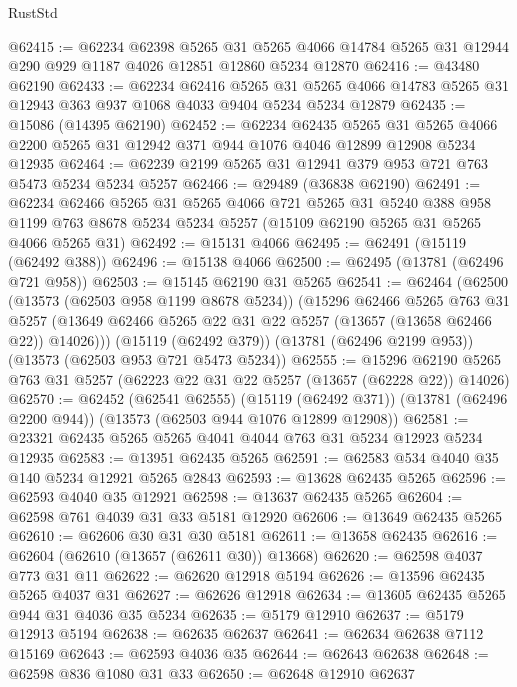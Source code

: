 \begin{lexlean}{RustStd}
\begin{coremodule}
@62415 := @62234
    @62398
    @5265
    @31
    @5265
    @4066
    @14784
    @5265
    @31
    @12944
    @290
    @929
    @1187
    @4026
    @12851
    @12860
    @5234
    @12870
@62416 := @43480 @62190
@62433 := @62234
    @62416
    @5265
    @31
    @5265
    @4066
    @14783
    @5265
    @31
    @12943
    @363
    @937
    @1068
    @4033
    @9404
    @5234
    @5234
    @12879
@62435 := @15086 (@14395 @62190)
@62452 := @62234
    @62435
    @5265
    @31
    @5265
    @4066
    @2200
    @5265
    @31
    @12942
    @371
    @944
    @1076
    @4046
    @12899
    @12908
    @5234
    @12935
@62464 := @62239 @2199 @5265 @31 @12941 @379 @953 @721 @763 @5473 @5234 @5234 @5257
@62466 := @29489 (@36838 @62190)
@62491 := @62234
    @62466
    @5265
    @31
    @5265
    @4066
    @721
    @5265
    @31
    @5240
    @388
    @958
    @1199
    @763
    @8678
    @5234
    @5234
    @5257
    (@15109 @62190 @5265 @31 @5265 @4066 @5265 @31)
@62492 := @15131 @4066
@62495 := @62491 (@15119 (@62492 @388))
@62496 := @15138 @4066
@62500 := @62495 (@13781 (@62496 @721 @958))
@62503 := @15145 @62190 @31 @5265
@62541 := @62464
    (@62500
      (@13573 (@62503 @958 @1199 @8678 @5234))
      (@15296
        @62466
        @5265
        @763
        @31
        @5257
        (@13649 @62466 @5265 @22 @31 @22 @5257 (@13657 (@13658 @62466 @22)) @14026)))
    (@15119 (@62492 @379))
    (@13781 (@62496 @2199 @953))
    (@13573 (@62503 @953 @721 @5473 @5234))
@62555 := @15296 @62190 @5265 @763 @31 @5257 (@62223 @22 @31 @22 @5257 (@13657 (@62228 @22)) @14026)
@62570 := @62452
    (@62541 @62555)
    (@15119 (@62492 @371))
    (@13781 (@62496 @2200 @944))
    (@13573 (@62503 @944 @1076 @12899 @12908))
@62581 := @23321 @62435 @5265 @5265 @4041 @4044 @763 @31 @5234 @12923 @5234 @12935
@62583 := @13951 @62435 @5265
@62591 := @62583 @534 @4040 @35 @140 @5234 @12921 @5265 @2843
@62593 := @13628 @62435 @5265
@62596 := @62593 @4040 @35 @12921
@62598 := @13637 @62435 @5265
@62604 := @62598 @761 @4039 @31 @33 @5181 @12920
@62606 := @13649 @62435 @5265
@62610 := @62606 @30 @31 @30 @5181
@62611 := @13658 @62435
@62616 := @62604 (@62610 (@13657 (@62611 @30)) @13668)
@62620 := @62598 @4037 @773 @31 @11
@62622 := @62620 @12918 @5194
@62626 := @13596 @62435 @5265 @4037 @31
@62627 := @62626 @12918
@62634 := @13605 @62435 @5265 @944 @31 @4036 @35 @5234
@62635 := @5179 @12910
@62637 := @5179 @12913 @5194
@62638 := @62635 @62637
@62641 := @62634 @62638 @7112 @15169
@62643 := @62593 @4036 @35
@62644 := @62643 @62638
@62648 := @62598 @836 @1080 @31 @33
@62650 := @62648 @12910 @62637

\end{coremodule}
\end{lexlean}
